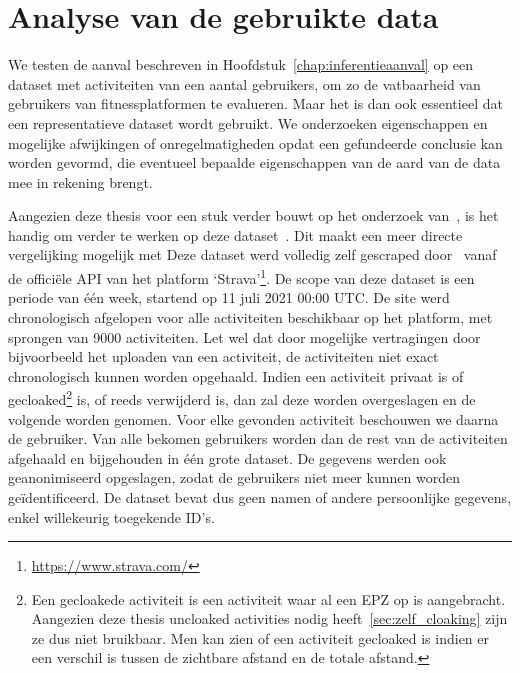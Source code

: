 \chapter{Analyse van de gebruikte data}
We testen de aanval beschreven in Hoofdstuk~\ref{chap:inferentieaanval} op een
dataset met activiteiten van een aantal gebruikers, om zo de vatbaarheid van
gebruikers van fitnessplatformen te evalueren. Maar het is dan ook essentieel
dat een representatieve dataset wordt gebruikt. We onderzoeken eigenschappen en
mogelijke afwijkingen of onregelmatigheden opdat een gefundeerde conclusie kan
worden gevormd, die eventueel bepaalde eigenschappen van de aard van de data
mee in rekening brengt.

Aangezien deze thesis voor een stuk verder bouwt op het onderzoek
van~\citeauthor{Dhondt}, is het handig om verder te werken op deze
dataset~\cite{Dhondt}. Dit maakt een meer directe vergelijking mogelijk met
Deze dataset werd volledig zelf gescraped door~\citeauthor{Dhondt} vanaf de
officiële \ac{API} van het platform
`Strava'\footnote{\url{https://www.strava.com/}}. De scope van deze dataset is
een periode van één week, startend op 11 juli 2021 00:00 \ac{UTC}. De site werd
chronologisch afgelopen voor alle activiteiten beschikbaar op het platform, met
sprongen van 9000 activiteiten. Let wel dat door mogelijke vertragingen door
bijvoorbeeld het uploaden van een activiteit, de activiteiten niet exact
chronologisch kunnen worden opgehaald. Indien een activiteit privaat is of
gecloaked\footnote{Een gecloakede activiteit is een activiteit waar al een EPZ
    op is aangebracht. Aangezien deze thesis uncloaked activities nodig
    heeft~\ref{sec:zelf_cloaking} zijn ze dus niet bruikbaar. Men kan zien of een
    activiteit gecloaked is indien er een verschil is tussen de zichtbare afstand
    en de totale afstand.} is, of reeds verwijderd is, dan zal deze worden
overgeslagen en de volgende worden genomen. Voor elke gevonden activiteit
beschouwen we daarna de gebruiker. Van alle bekomen gebruikers worden dan de
rest van de activiteiten afgehaald en bijgehouden in één grote dataset. De
gegevens werden ook geanonimiseerd opgeslagen, zodat de gebruikers niet meer
kunnen worden geïdentificeerd. De dataset bevat dus geen namen of andere
persoonlijke gegevens, enkel willekeurig toegekende ID's.

